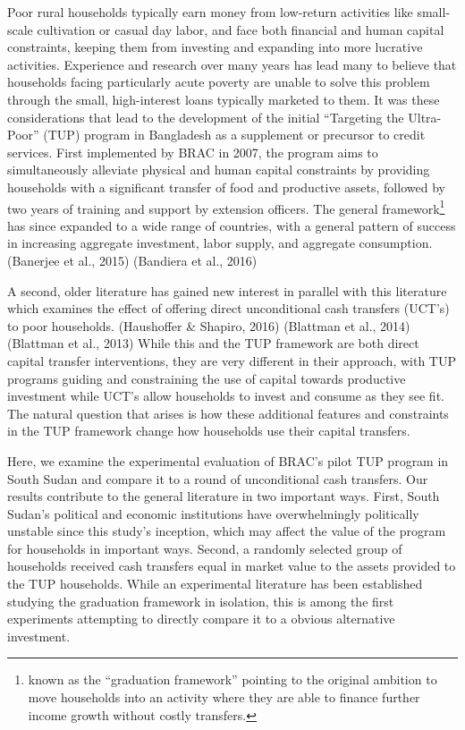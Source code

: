 \documentclass[12pt,article]{article}
\begin{document}
Poor rural households typically earn money from low-return activities like
small-scale cultivation or casual day labor, and face both financial and human
capital constraints, keeping them from investing and expanding into more lucrative
activities. Experience and research over many years has lead many to believe that
households facing particularly acute poverty are unable to solve this problem through
the small, high-interest loans typically marketed to them. It was these
considerations that lead to the development of the initial ``Targeting the
Ultra-Poor'' (TUP) program in Bangladesh as a supplement or precursor to credit
services. First implemented by BRAC in 2007, the program aims to simultaneously
alleviate physical and human capital constraints by providing households with a
significant transfer of food and productive assets, followed by two years of training
and support by extension officers. The general framework\footnote{known as the
``graduation framework'' pointing to the original ambition to move households into an
activity where they are able to finance further income growth without costly
transfers.} has since expanded to a wide range of countries, with a general pattern
of success in increasing aggregate investment, labor supply, and aggregate
consumption. (Banerjee et al., 2015) (Bandiera et al., 2016)

A second, older literature has gained new interest in parallel with this
literature which examines the effect of offering direct unconditional cash transfers
(UCT's) to poor households. (Haushoffer \& Shapiro, 2016) (Blattman et al., 2014)
(Blattman et al., 2013) While this and the TUP framework are both direct capital transfer
interventions, they are very different in their approach, with TUP programs guiding
and constraining the use of capital towards productive investment while UCT's allow
households to invest and consume as they see fit. The natural question that arises is
how these additional features and constraints in the TUP framework change how
households use their capital transfers.

Here, we examine the experimental evaluation of BRAC's pilot TUP program in South
Sudan and compare it to a round of unconditional cash transfers. Our results
contribute to the general literature in two important ways. First, South Sudan's
political and economic institutions have overwhelmingly politically unstable since
this study's inception, which may affect the value of the program for
households in important ways. Second, a randomly selected group of households
received cash transfers equal in market value to the assets provided to the TUP
households. While an experimental literature has been established studying the
graduation framework in isolation, this is among the first experiments attempting to
directly compare it to a obvious alternative investment.
\end{document}
